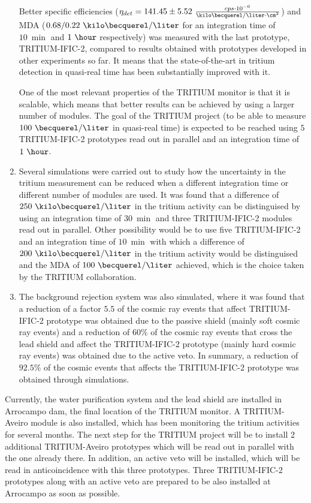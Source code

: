 \begin{enumerate}
Better specific efficiencies ($\eta_{det} = 141.45\pm5.52~\frac{cps \cdot{} 10^{-6}}{\kilo\becquerel/ \liter \cdot{} \cm^2}$) and MDA ($0.68 /0.22~\kilo\becquerel / \liter$ for an integration time of $10~\min$ and $1~\hour$ respectively) was measured with the last prototype, TRITIUM-IFIC-2, compared to results obtained with prototypes developed in other experiments so far. It means that the state-of-the-art in tritium detection in quasi-real time has been substantially improved with it. 

One of the most relevant properties of the TRITIUM monitor is that it is scalable, which means that better results can be achieved by using a larger number of modules. The goal of the TRITIUM project (to be able to measure $100~\becquerel/\liter$ in quasi-real time) is expected to be reached using $5$ TRITIUM-IFIC-2 prototypes read out in parallel and an integration time of $1~\hour$.

\item{} Several simulations were carried out to study how the uncertainty in the tritium measurement can be reduced when a different integration time or different number of modules are used. It was found that a difference of $250~\kilo\becquerel/\liter$ in the tritium activity can be distinguised by using an integration time of $30~\min$ and three TRITIUM-IFIC-2 modules read out in parallel. Other possibility would be to use five TRITIUM-IFIC-2 and an integration time of $10~\min$ with which a difference of $200~\kilo\becquerel/\liter$ in the tritium activity would be distinguised and the MDA of $100~\becquerel/\liter$ achieved, which is the choice taken by the TRITIUM collaboration.

\item{} The background rejection system was also simulated, where it was found that a reduction of a factor $5.5$ of the cosmic ray events that affect TRITIUM-IFIC-2 prototype was obtained due to the passive shield (mainly soft cosmic ray events) and a reduction of $60\%$ of the cosmic ray events that cross the lead shield and affect the TRITIUM-IFIC-2 prototype (mainly hard cosmic ray events) was obtained due to the active veto. In summary, a reduction of $92.5\%$ of the cosmic events that affects the TRITIUM-IFIC-2 prototype was obtained through simulations.

\end{enumerate}

Currently, the water purification system and the lead shield are installed in Arrocampo dam, the final location of the TRITIUM monitor. A TRITIUM-Aveiro module is also installed, which has been monitoring the tritium activities for several months. The next step for the TRITIUM project will be to install 2 additional TRITIUM-Aveiro prototypes which will be read out in parallel with the one already there. In addition, an active veto will be installed, which will be read in anticoincidence with this three prototypes. Three TRITIUM-IFIC-2 prototypes along with an active veto are prepared to be also installed at Arrocampo as soon as possible.

